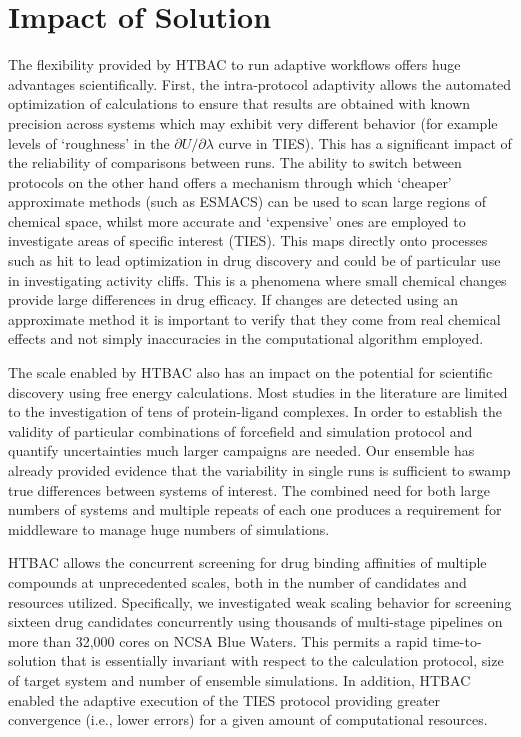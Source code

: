 \documentclass[conference]{IEEEtran}
\begin{document}
\section{Impact of Solution}\label{sec:impact}


The flexibility provided by HTBAC to run adaptive workflows offers huge advantages scientifically.
First, the intra-protocol adaptivity allows the automated optimization of calculations to ensure that
results are obtained with known precision across systems which may exhibit very different behavior (for example levels of `roughness' in the $\partial U/\partial\lambda$ curve in TIES).
This has a significant impact of the reliability of comparisons between runs.
The ability to switch between protocols on the other hand offers a mechanism through which `cheaper' approximate methods (such as ESMACS) can be used to scan large regions of chemical space, whilst more accurate and `expensive' ones are employed to investigate areas of specific interest (TIES).
This maps directly onto processes such as hit to lead optimization in drug discovery and could be of particular use in investigating activity cliffs.
This is a phenomena where small chemical changes provide large differences in drug efficacy.
If changes are detected using an approximate method it is important to verify that they come from
real chemical effects and not simply inaccuracies in the computational algorithm employed.

The scale enabled by HTBAC also has an impact on the potential for scientific discovery using free energy calculations.
Most studies in the literature are limited to the investigation of tens of protein-ligand complexes.
In order to establish the validity of particular combinations of forcefield and simulation protocol and
quantify uncertainties much larger campaigns are needed.
Our ensemble has already provided evidence that the variability in single runs is sufficient to
swamp true differences between systems of interest.
The combined need for both large numbers of systems and multiple repeats of each one produces a requirement
for middleware to manage huge numbers of simulations.

HTBAC allows the concurrent screening
for drug binding affinities of multiple compounds at unprecedented scales,
both in the number of candidates and resources utilized. Specifically, we
investigated weak scaling behavior for screening sixteen drug candidates
concurrently using thousands of multi-stage pipelines on more than 32,000
cores on NCSA Blue Waters. This permits a rapid time-to-solution that is
essentially invariant with respect to the calculation protocol,
size of target system and number of ensemble simulations. In addition,
HTBAC enabled the adaptive execution of the TIES protocol
providing greater convergence (i.e., lower errors) for a given amount of
computational resources.
\end{document}
